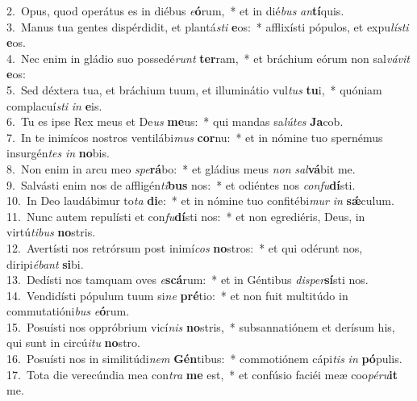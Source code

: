 {2.~}Opus, quod operátus es in diébus \textit{e}\textbf{ó}rum,~* et in dié\textit{bus} \textit{an}\textbf{tí}quis.\\
{3.~}Manus tua gentes dispérdidit, et plantá\textit{sti} \textbf{e}os:~* afflixísti pópulos, et expu\textit{lí}\textit{sti} \textbf{e}os.\\
{4.~}Nec enim in gládio suo possedé\textit{runt} \textbf{ter}ram,~* et bráchium eórum non sal\textit{vá}\textit{vit} \textbf{e}os:\\
{5.~}Sed déxtera tua, et bráchium tuum, et illuminátio vul\textit{tus} \textbf{tu}i,~* quóniam complacuí\textit{sti} \textit{in} \textbf{e}is.\\
{6.~}Tu es ipse Rex meus et De\textit{us} \textbf{me}us:~* qui mandas sa\textit{lú}\textit{tes} \textbf{Ja}cob.\\
{7.~}In te inimícos nostros ventilábi\textit{mus} \textbf{cor}nu:~* et in nómine tuo spernémus insurgén\textit{tes} \textit{in} \textbf{no}bis.\\
{8.~}Non enim in arcu meo \textit{spe}\textbf{rá}bo:~* et gládius meus \textit{non} \textit{sal}\textbf{vá}bit me.\\
{9.~}Salvásti enim nos de affligén\textit{ti}\textbf{bus} nos:~* et odiéntes nos \textit{con}\textit{fu}\textbf{dí}sti.\\
{10.~}In Deo laudábimur to\textit{ta} \textbf{di}e:~* et in nómine tuo confitébi\textit{mur} \textit{in} \textbf{sǽ}culum.\\
{11.~}Nunc autem repulísti et con\textit{fu}\textbf{dí}sti nos:~* et non egrediéris, Deus, in virtú\textit{ti}\textit{bus} \textbf{no}stris.\\
{12.~}Avertísti nos retrórsum post inimí\textit{cos} \textbf{no}stros:~* et qui odérunt nos, diripi\textit{é}\textit{bant} \textbf{si}bi.\\
{13.~}Dedísti nos tamquam oves \textit{e}\textbf{scá}rum:~* et in Géntibus \textit{di}\textit{sper}\textbf{sí}sti nos.\\
{14.~}Vendidísti pópulum tuum si\textit{ne} \textbf{pré}tio:~* et non fuit multitúdo in commutatióni\textit{bus} \textit{e}\textbf{ó}rum.\\
{15.~}Posuísti nos oppróbrium vicí\textit{nis} \textbf{no}stris,~* subsannatiónem et derísum his, qui sunt in circú\textit{i}\textit{tu} \textbf{no}stro.\\
{16.~}Posuísti nos in similitúdi\textit{nem} \textbf{Gén}tibus:~* commotiónem cápi\textit{tis} \textit{in} \textbf{pó}pulis.\\
{17.~}Tota die verecúndia mea con\textit{tra} \textbf{me} est,~* et confúsio faciéi meæ coo\textit{pé}\textit{ru}\textbf{it} me.\\
